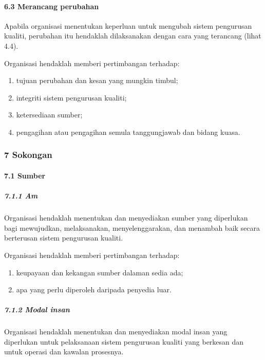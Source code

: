 \documentclass[
]{article}
\begin{document}
\hypertarget{merancang-perubahan}{%
\paragraph{6.3 Merancang perubahan}\label{merancang-perubahan}}

Apabila organisasi menentukan keperluan untuk mengubah sistem pengurusan
kualiti, perubahan itu hendaklah dilaksanakan dengan cara yang terancang
(lihat 4.4).

Organisasi hendaklah memberi pertimbangan terhadap:

\begin{enumerate}
\def\labelenumi{\alph{enumi})}
\item
  tujuan perubahan dan kesan yang mungkin timbul;
\item
  integriti sistem pengurusan kualiti;
\item
  ketersediaan sumber;
\item
  pengagihan atau pengagihan semula tanggungjawab dan bidang kuasa.
\end{enumerate}

\hypertarget{sokongan}{%
\subsubsection{7 Sokongan}\label{sokongan}}

\hypertarget{sumber}{%
\paragraph{7.1 Sumber}\label{sumber}}

\hypertarget{am-2}{%
\subparagraph{7.1.1 Am}\label{am-2}}

Organisasi hendaklah menentukan dan menyediakan sumber yang diperlukan
bagi mewujudkan, melaksanakan, menyelenggarakan, dan menambah baik
secara berterusan sistem pengurusan kualiti.

Organisasi hendaklah memberi pertimbangan terhadap:

\begin{enumerate}
\def\labelenumi{\alph{enumi})}
\item
  keupayaan dan kekangan sumber dalaman sedia ada;
\item
  apa yang perlu diperoleh daripada penyedia luar.
\end{enumerate}

\hypertarget{modal-insan}{%
\subparagraph{7.1.2 Modal insan}\label{modal-insan}}

Organisasi hendaklah menentukan dan menyediakan modal insan yang
diperlukan untuk pelaksanaan sistem pengurusan kualiti yang berkesan dan
untuk operasi dan kawalan prosesnya.
\end{document}
